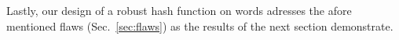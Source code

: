 \documentclass[11pt]{article}
\newcommand{\ps}[1]{\textcolor{purple}{PS: #1}}
\newcommand{\method}{\textsc{T-Free}}
\begin{document}
Lastly, our design of a robust hash function on words adresses the afore mentioned flaws (Sec.~\ref{sec:flaws}) as the results of the next section demonstrate.






\end{document}
